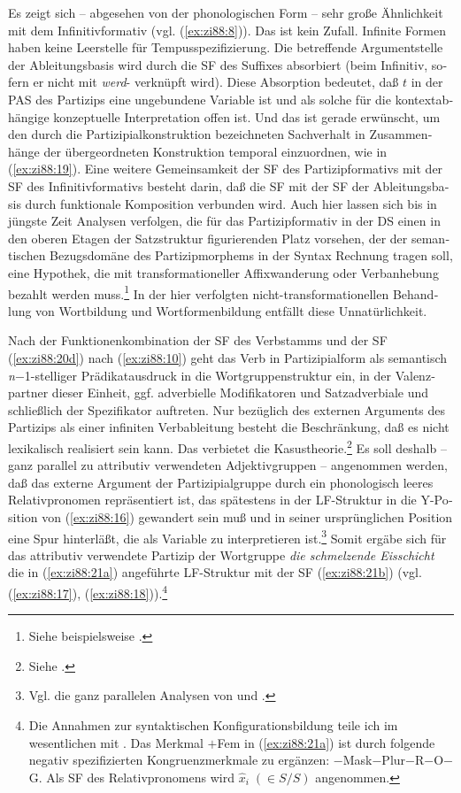 \documentclass[output=paper,colorlinks,citecolor=brown, booklanguage=german]{langscibook}
\begin{document}
\begin{otherlanguage}{german}
\noindent Es zeigt sich -- abgesehen von der phonologischen Form -- sehr große Ähnlichkeit mit dem Infinitivformativ (vgl. (\ref{ex:zi88:8})). Das ist kein Zufall. Infinite Formen haben keine Leerstelle für Tempusspezifizierung. Die betreffende Argumentstelle der Ableitungsbasis wird durch die SF des Suffixes absorbiert (beim Infinitiv, sofern er nicht mit \textit{werd}- verknüpft wird). Diese Absorption bedeutet, daß $t$ in der PAS des Partizips eine ungebundene Variable ist und als solche für die kontextabhängige konzeptuelle Interpretation offen ist. Und das ist gerade erwünscht, um den durch die Partizipialkonstruktion bezeichneten Sachverhalt in Zusammenhänge der übergeordneten Konstruktion temporal einzuordnen, wie in (\ref{ex:zi88:19}). Eine weitere Gemeinsamkeit der SF des Partizipformativs mit der SF des Infinitivformativs besteht darin, daß die SF mit der SF der Ableitungsbasis durch funktionale Komposition verbunden wird. Auch hier lassen sich bis in jüngste Zeit Analysen verfolgen, die für das Partizipformativ in der DS einen in den oberen Etagen der Satzstruktur figurierenden Platz vorsehen, der der semantischen Bezugsdomäne des Partizipmorphems in der Syntax Rechnung tragen soll, eine Hypothek, die mit transformationeller Affixwanderung oder Verbanhebung bezahlt werden muss.\footnote{Siehe beispielsweise \citet{Toman1986,Toman1988}.} In der hier verfolgten nicht-transformationellen Behandlung von Wortbildung und Wortformenbildung entfällt diese Unnatürlichkeit. 

\largerpage
Nach der Funktionenkombination der SF des Verbstamms und der SF (\ref{ex:zi88:20d}) nach (\ref{ex:zi88:10}) geht das Verb in Partizipialform als semantisch \textit{n}$-$1-stelliger Prä\-di\-kat\-aus\-druck in die Wortgruppenstruktur ein, in der Valenzpartner dieser Einheit, ggf. adverbielle Modifikatoren und Satzadverbiale und schließlich der Spezifikator auftreten. Nur bezüglich des externen Arguments des Partizips als einer infiniten Verbableitung besteht die Beschränkung, daß es nicht lexikalisch realisiert sein kann. Das verbietet die Kasustheorie.\footnote{Siehe \citet{Chomsky1981,Chomsky1982,Chomsky1986}.} Es soll deshalb -- ganz pa\-rallel zu attributiv verwendeten Adjektivgruppen -- angenommen werden, daß das externe Argument der Partizipialgruppe durch ein phonologisch leeres Relativpronomen repräsentiert ist, das spätestens in der LF-Struktur in die Y-Position von (\ref{ex:zi88:16}) gewandert sein muß und in seiner ursprünglichen Position eine Spur hinterläßt, die als Variable zu interpretieren ist.\footnote{Vgl. die ganz parallelen Analysen von \citet{Fanselow1986b,Fanselow1986a} und \citet{Zimmermann1988-druck}.} Somit ergäbe sich für das attributiv verwendete Partizip der Wortgruppe \textit{die schmelzende Eisschicht} die in (\ref{ex:zi88:21a}) angeführte LF-Struktur mit der SF (\ref{ex:zi88:21b}) (vgl. (\ref{ex:zi88:17}), (\ref{ex:zi88:18})).\footnote{Die Annahmen zur syntaktischen Konfigurationsbildung teile ich im wesentlichen mit \citet{Haftka1988-drucka,Haftka1988-druckb,Haftka1987}. Das Merkmal $+$Fem in (\ref{ex:zi88:21a}) ist durch folgende negativ spezifizierten Kongruenzmerkmale zu ergänzen: $-$Mask$-$Plur$-$R$-$O$-$G. Als SF des Relativpronomens wird $\hat{x}_i \; (\in S/S)$ angenommen.}


\end{otherlanguage}
\end{document}
